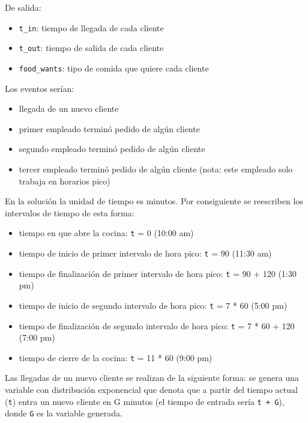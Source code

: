 \documentclass{article}
\begin{document}
        De salida:

        \begin{itemize}[label=\textbullet]
            \item \texttt{t\_in}: tiempo de llegada de cada cliente
            \item \texttt{t\_out}: tiempo de salida de cada cliente
            \item \texttt{food\_wants}: tipo de comida que quiere cada cliente
        \end{itemize}

        Los eventos serían:

        \begin{itemize}[label=\textbullet]
            \item llegada de un nuevo cliente
            \item primer empleado terminó pedido de algún cliente
            \item segundo empleado terminó pedido de algún cliente
            \item tercer empleado terminó pedido de algún cliente (nota: este empleado solo trabaja en horarios pico)
        \end{itemize}

        En la solución la unidad de tiempo es minutos. Por consiguiente se reescriben los intervalos de tiempo de esta forma:

        \begin{itemize}[label=\textbullet]
            \item tiempo en que abre la cocina: \texttt{t} = 0 (10:00 am)
            \item tiempo de inicio de primer intervalo de hora pico: \texttt{t} = 90 (11:30 am)
            \item tiempo de finalización de primer intervalo de hora pico: \texttt{t} = 90 + 120 (1:30 pm)
            \item tiempo de inicio de segundo intervalo de hora pico: \texttt{t} = 7 * 60 (5:00 pm)
            \item tiempo de finalización de segundo intervalo de hora pico: \texttt{t} = 7 * 60 + 120 (7:00 pm)
            \item tiempo de cierre de la cocina: \texttt{t} = 11 * 60 (9:00 pm)
        \end{itemize}

        Las llegadas de un nuevo cliente se realizan de la siguiente forma: se genera una variable con distribución exponencial
        que denota que a partir del tiempo actual (\texttt{t}) entra un nuevo cliente en G minutos (el tiempo de entrada sería \texttt{t + G}),
        donde \texttt{G} es la variable generada.
\end{document}
